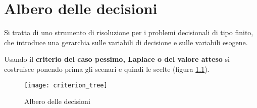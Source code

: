 \documentclass[\main/main.tex]{subfiles}
\begin{document}
\chapter{Albero delle decisioni}
Si tratta di uno strumento di risoluzione per i problemi decisionali di tipo finito, che introduce una gerarchia sulle variabili di decisione e sulle variabili esogene.

Usando il \textbf{criterio del caso pessimo, Laplace o del valore atteso} si costruisce ponendo prima gli scenari e quindi le scelte (figura \ref{criterion_tree}).

\begin{figure}
  \texttt{[image: criterion\_tree]}
  \caption{Albero delle decisioni}
  \label{criterion_tree}
\end{figure}
\end{document}

